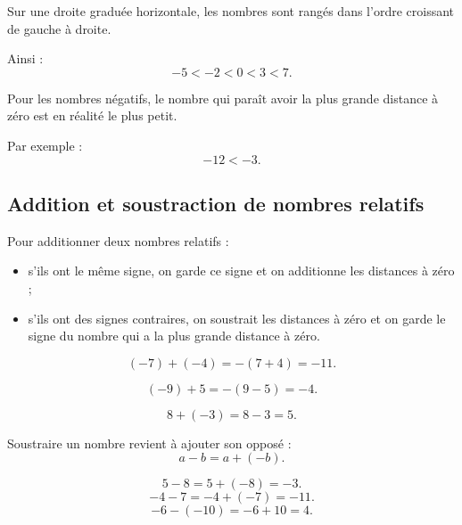 \documentclass[11pt,a4paper]{article}
\begin{document}
\begin{center}
\end{center}

\begin{propriete}
Sur une droite graduée horizontale, les nombres sont rangés dans l'ordre croissant de gauche à droite.

Ainsi :
\[
-5<-2<0<3<7.
\]
\end{propriete}

\begin{attention}
Pour les nombres négatifs, le nombre qui paraît avoir la plus grande distance à zéro est en réalité le plus petit.

Par exemple :
\[
-12 < -3.
\]
\end{attention}

\subsection{Addition et soustraction de nombres relatifs}

\begin{propriete}
Pour additionner deux nombres relatifs :
\begin{itemize}
  \item s'ils ont le même signe, on garde ce signe et on additionne les distances à zéro ;
  \item s'ils ont des signes contraires, on soustrait les distances à zéro et on garde le signe du nombre qui a la plus grande distance à zéro.
\end{itemize}
\end{propriete}

\begin{exemple}
\[
(-7)+(-4)=-(7+4)=-11.
\]

\[
(-9)+5=-(9-5)=-4.
\]

\[
8+(-3)=8-3=5.
\]
\end{exemple}

\begin{propriete}
Soustraire un nombre revient à ajouter son opposé :
\[
a-b=a+(-b).
\]
\end{propriete}

\begin{exemple}
\[
5-8=5+(-8)=-3.
\]
\[
-4-7=-4+(-7)=-11.
\]
\[
-6-(-10)=-6+10=4.
\]
\end{exemple}
\end{document}
